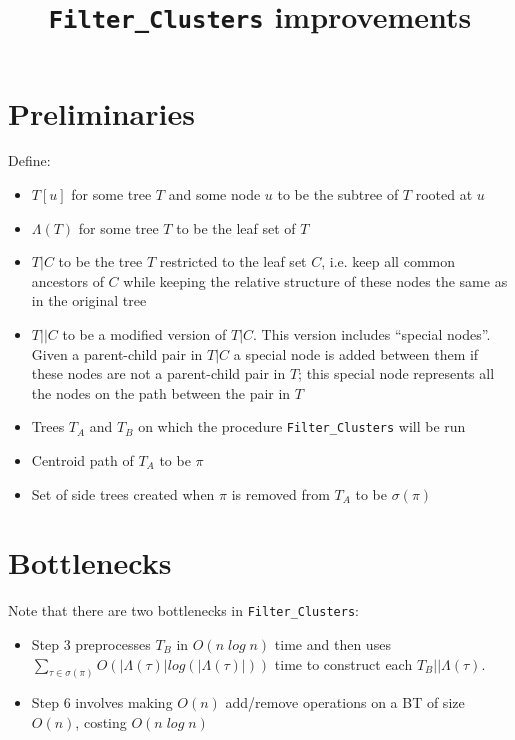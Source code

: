 \documentclass[a4paper]{article}
\title{\texttt{Filter\_Clusters} improvements}
\begin{document}
    \maketitle

    \section{Preliminaries}
    Define:
    \begin{itemize}
        \item $T[u]$ for some tree $T$ and some node $u$ to be the subtree of $T$ rooted at $u$
        \item $\Lambda(T)$ for some tree $T$ to be the leaf set of $T$
        \item $T|C$ to be the tree $T$ restricted to the leaf set $C$, i.e. keep all common ancestors of $C$ while keeping the relative structure of these nodes the same as in the original tree
        \item $T||C$ to be a modified version of $T|C$. This version includes ``special nodes''. Given a parent-child pair in $T|C$ a special node is added between them if these nodes are not a parent-child pair in $T$; this special node represents all the nodes on the path between the pair in $T$
        \item Trees $T_A$ and $T_B$ on which the procedure \texttt{Filter\_Clusters} will be run
        \item Centroid path of $T_A$ to be $\pi$
        \item Set of side trees created when $\pi$ is removed from $T_A$ to be $\sigma(\pi)$
    \end{itemize}

    \section{Bottlenecks}

    Note that there are two bottlenecks in \texttt{Filter\_Clusters}:
    \begin{itemize}
        \item Step 3 preprocesses $T_B$ in $O(n\;log\;n)$ time and then uses $\sum_{\tau\in\sigma(\pi)}O(|\Lambda(\tau)|log(|\Lambda(\tau)|))$ time to construct each $T_B||\Lambda(\tau)$.

        \item Step 6 involves making $O(n)$ add/remove operations on a BT of size $O(n)$, costing $O(n\;log\;n)$
    \end{itemize}
\end{document}
